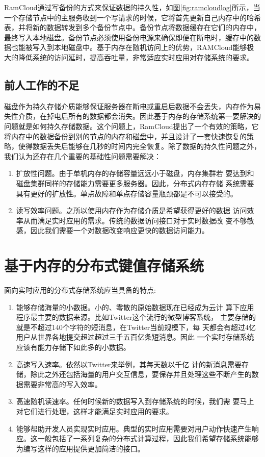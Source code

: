 RamCloud通过写备份的方式来保证数据的持久性\cite{ongaro2011fast}，如图\ref{fig:ramcloudlog}所示，当一个存储节点中的主服务收到一个写请求的时候，它将首先更新自己内存中的哈希表，并将新的数据转发到多个备份节点中。备份节点将数据缓存在它们的内存中，最终写入本地磁盘。备份节点必须使用备份电源来确保即便在断电时，缓存中的数据也能被写入到本地磁盘中。基于内存在随机访问上的优势，RAMCloud能够极大的降低系统的访问延时，提高吞吐量，非常适应实时应用对存储系统的要求。

\subsection{前人工作的不足}
磁盘作为持久存储介质能够保证服务器在断电或重启后数据不会丢失，内存作为易失性介质，在掉电后所有的数据都会消失。因此基于内存的存储系统第一要解决的问题就是如何持久存储数据。这个问题上，RamCloud提出了一个有效的策略，它将内存中的数据备份到别的节点的内存和磁盘中，并且设计了一套快速恢复的策略，使得数据丢失后能够在几秒的时间内完全恢复。除了数据的持久性问题之外，我们认为还存在几个重要的基础性问题需要解决：
\begin{enumerate}
  \item 扩放性问题。由于单机内存的存储容量远远小于磁盘，内存集群若
    要达到和磁盘集群同样的存储能力需要更多服务器。因此，分布式内存存储
    系统需要具有更好的扩放性。单点故障和单点存储容量瓶颈都是不可以接受的。
    
  \item 读写效率问题。之所以使用内存作为存储介质是希望获得更好的数据
    访问效率从而满足实时应用的需求。传统的数据访问接口对于实时数据改
    变不够敏感，因此我们需要一个对数据改变响应更快的数据访问能力。
\end{enumerate}

\section{基于内存的分布式键值存储系统}
\label{section:techs}
面向实时应用的分布式存储系统应当具备的特点:
\begin{enumerate}
  \item 能够存储海量的小数据。小的、零散的原始数据现在已经成为云计
    算下应用程序最主要的数据来源。比如Twitter这个流行的微型博客系统，
    主要存储的就是不超过140个字符的短消息，在Twitter当前规模下，每
    天都会有超过4亿用户从世界各地提交超过超过三千五百亿条短消息。因此
    一个实时存储系统应该有能力存储下如此多的小数据。
  \item 高速写入速率。依然以Twitter来举例，其每天数以千亿
    计的新消息需要存储，除此之外还包括海量的用户交互信息，要保存并且处理这些不断产生的数据需要非常高的写入效率。
  \item 高速随机读速率。任何时候新的数据写入到存储系统的时候，我们需
    要马上对它们进行处理，这样才能满足实时应用的要求。
  \item 能够帮助开发人员实现实时应用。典型的实时应用需要对用户动作快速产生响应。这一般包括了一系列复杂的分布式计算过程，因此我们希望存储系统能够为编写这样的应用提供更加简洁的接口。
\end{enumerate}

